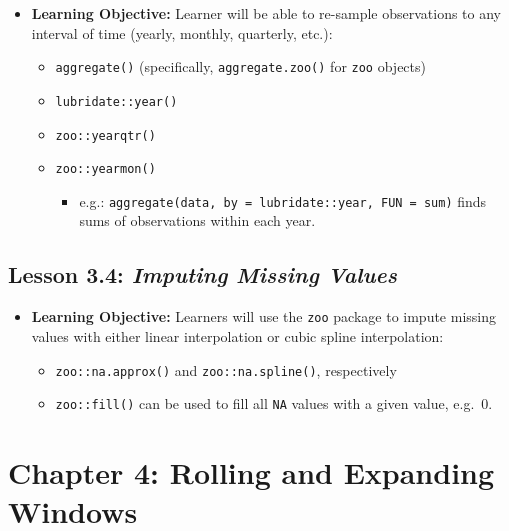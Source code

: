\documentclass[
]{book}
\providecommand{\tightlist}{%
  \setlength{\itemsep}{0pt}\setlength{\parskip}{0pt}}
\begin{document}
\begin{itemize}
\tightlist
\item
  \textbf{Learning Objective:} Learner will be able to re-sample observations to any interval of time (yearly, monthly, quarterly, etc.):

  \begin{itemize}
  \tightlist
  \item
    \texttt{aggregate()} (specifically, \texttt{aggregate.zoo()} for \texttt{zoo} objects)
  \item
    \texttt{lubridate::year()}
  \item
    \texttt{zoo::yearqtr()}
  \item
    \texttt{zoo::yearmon()}

    \begin{itemize}
    \tightlist
    \item
      e.g.: \texttt{aggregate(data,\ by\ =\ lubridate::year,\ FUN\ =\ sum)} finds sums of observations within each year.
    \end{itemize}
  \end{itemize}
\end{itemize}

\hypertarget{lesson-3.4-imputing-missing-values}{%
\subsection*{\texorpdfstring{Lesson 3.4: \emph{Imputing Missing Values}}{Lesson 3.4: Imputing Missing Values}}\label{lesson-3.4-imputing-missing-values}}

\begin{itemize}
\tightlist
\item
  \textbf{Learning Objective:} Learners will use the \texttt{zoo} package to impute missing values with either linear interpolation or cubic spline interpolation:

  \begin{itemize}
  \tightlist
  \item
    \texttt{zoo::na.approx()} and \texttt{zoo::na.spline()}, respectively
  \item
    \texttt{zoo::fill()} can be used to fill all \texttt{NA} values with a given value, e.g.~0.
  \end{itemize}
\end{itemize}

\hypertarget{chapter-4-rolling-and-expanding-windows}{%
\section*{Chapter 4: Rolling and Expanding Windows}\label{chapter-4-rolling-and-expanding-windows}}
\end{document}
